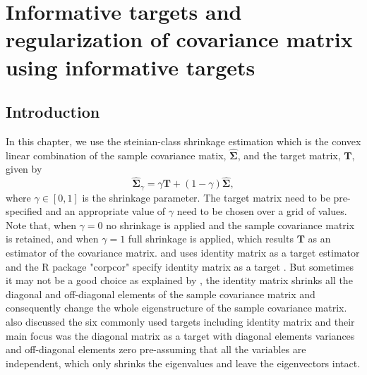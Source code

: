 
\chapter{Informative targets and regularization of covariance matrix using informative targets}
\def\tr{\mbox{tr}}



\section{Introduction} \label{sec1}
In this chapter, we use the steinian-class shrinkage estimation which is the convex linear combination of the sample covariance matix, $\boldsymbol{\hat{\Sigma}}$, and the target matrix, $\textbf{T}$, given by 
 \begin{equation}
    \hat{\boldsymbol{\Sigma}}_{\gamma}  = \gamma\textbf{T} + (1-\gamma) \hat{\boldsymbol{\Sigma}},
     \label{equ1}
     \end{equation}
where $\gamma  \in [0,1]$ is the shrinkage parameter. The target matrix need to be pre-specified and an appropriate value of $\gamma$ need to be chosen over a grid of values. Note that, when $\gamma=0$ no shrinkage is applied and the sample covariance matrix is retained, and when $\gamma=1$ full shrinkage is applied, which results $\textbf{T}$ as an estimator of the covariance matrix. \cite{ledoit2003improved} and \cite{ledoit2004well} uses identity matrix as a target estimator and the R package "corpcor" specify identity matrix as a target \citep{schaefer2013corpcor}. But sometimes it may not be a good choice as explained by \cite{schafer2005shrinkage}, the identity matrix shrinks all the diagonal and off-diagonal elements of the sample covariance matrix and consequently change the whole eigenstructure of the sample covariance matrix. \cite{schafer2005shrinkage} also discussed the six commonly used targets including identity matrix and their main focus was the diagonal matrix as a target with diagonal elements variances and off-diagonal elements zero pre-assuming that all the variables are independent, which only shrinks the eigenvalues and leave the eigenvectors intact.  

